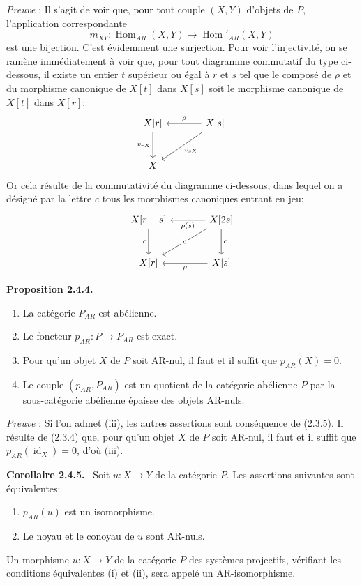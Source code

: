 \documentclass[11pt]{article}
\newenvironment{statement}[1]{\par\medskip\noindent\textbf{#1.}\ }{\par\medskip}
\DeclareMathOperator{\Hom}{Hom}
\providecommand{\id}{\operatorname{id}}
\providecommand{\Hom}{\operatorname{Hom}}
\providecommand{\id}{\operatorname{id}}
\providecommand{\id}{\operatorname{id}}
\providecommand{\id}{\operatorname{id}}
\providecommand{\id}{\operatorname{id}}
\providecommand{\Hom}{\operatorname{Hom}}
\providecommand{\id}{\operatorname{id}}
\begin{document}
\emph{Preuve} : Il s'agit de voir que, pour tout couple $(X,Y)$ d'objets de $P$, l'application correspondante
\[
m_{XY}:\Hom_{AR}(X,Y)\longrightarrow\Hom'_{AR}(X,Y)
\]
est une bijection. C'est évidemment une surjection. Pour voir l'injectivité, on se ramène immédiatement à voir que, pour tout diagramme commutatif du type ci-dessous, il existe un entier $t$ supérieur ou égal à $r$ et $s$ tel que le composé de $\rho$ et du morphisme canonique de $X[t]$ dans $X[s]$ soit le morphisme canonique de $X[t]$ dans $X[r]$:
\[
\begin{tikzcd}[column sep=large,row sep=large]
X[r] \arrow[d,"{v_{rX}}"'] & X[s] \arrow[l,"\rho"'] \arrow[dl,"{v_{sX}}"]\\
X & {}
\end{tikzcd}
\]
Or cela résulte de la commutativité du diagramme ci-dessous, dans lequel on a désigné par la lettre $c$ tous les morphismes canoniques entrant en jeu:
\[
\begin{tikzcd}[column sep=large,row sep=large]
X[r+s] \arrow[d,"c"'] & X[2s] \arrow[l,"\rho(s)"] \arrow[d,"c"] \arrow[dl,"c" description]\\
X[r] & X[s] \arrow[l,"\rho"]
\end{tikzcd}
\]

\begin{statement}{Proposition 2.4.4}
\begin{enumerate}[label=(\roman*)]
\item La catégorie $P_{AR}$ est abélienne.
\item Le foncteur $p_{AR}:P\to P_{AR}$ est exact.
\item Pour qu'un objet $X$ de $P$ soit AR-nul, il faut et il suffit que $p_{AR}(X)=0$.
\item Le couple $(p_{AR},P_{AR})$ est un quotient de la catégorie abélienne $P$ par la sous-catégorie abélienne épaisse des objets AR-nuls.
\end{enumerate}
\end{statement}

\emph{Preuve} : Si l'on admet (iii), les autres assertions sont conséquence de (2.3.5). Il résulte de (2.3.4) que, pour qu'un objet $X$ de $P$ soit AR-nul, il faut et il suffit que $p_{AR}(\id_X)=0$, d'où (iii).

\begin{statement}{Corollaire 2.4.5}
Soit $u:X\to Y$ de la catégorie $P$. Les assertions suivantes sont équivalentes:
\begin{enumerate}[label=(\roman*)]
\item $p_{AR}(u)$ est un isomorphisme.
\item Le noyau et le conoyau de $u$ sont AR-nuls.
\end{enumerate}
Un morphisme $u:X\to Y$ de la catégorie $P$ des systèmes projectifs, vérifiant les conditions équivalentes (i) et (ii), sera appelé un AR-isomorphisme.
\end{statement}
\end{document}
